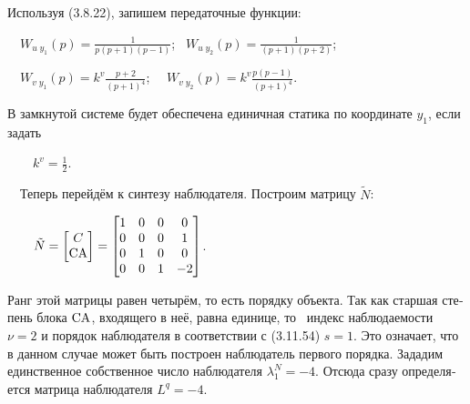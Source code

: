 \documentclass[a4paper]{article}
\newcommand\normalsubformula[1]{\text{\mathversion{normal}$#1$}}
\begin{document}
{\begin{russian}\sffamily
Используя (3.8.22), запишем передаточные функции:
\end{russian}}

{\begin{russian}\sffamily
\ \  $W_{u\;y_1}(p)=\frac 1{p(p+1)(p-1)}$; \  $W_{u\;y_2}(p)=\frac 1{(p+1)(p+2)}$;
\end{russian}}

{\begin{russian}\sffamily
\ \  $W_{v\;y_1}(p)=k^v\frac{p+2}{(p+1)^4}$; \ \  $W_{v\;y_2}(p)=k^v\frac{p(p-1)}{(p+1)^4}$.
\end{russian}}

{\begin{russian}\sffamily
В замкнутой системе будет обеспечена единичная статика по координате  $y_1$, если задать
\end{russian}}

{\begin{russian}\sffamily
\ \ \ \  $k^v=\frac 1 2$.
\end{russian}}


\bigskip


\bigskip


\bigskip

{\begin{russian}\sffamily
\ \ Теперь перейдём к синтезу наблюдателя. Построим матрицу  $\tilde  N$:
\end{russian}}

{\begin{russian}\sffamily
\ \ \ \  $\tilde 
N=\left[\begin{matrix}C\\\normalsubformula{\text{CA}}\end{matrix}\right]=\left[\begin{matrix}1&0&0&0\\0&0&0&1\\0&1&0&0\\0&0&1&-2\end{matrix}\right]$.
\end{russian}}

{\begin{russian}\sffamily
Ранг этой матрицы равен четырём, то есть порядку объекта. Так как старшая степень блока  $\normalsubformula{\text{CA}}$,
входящего в неё, равна единице, то \ индекс наблюдаемости  $ν=2$ и порядок наблюдателя в соответствии с (3.11.54) 
$s=1$. Это означает, что в данном случае может быть построен наблюдатель первого порядка. Зададим единственное
собственное число наблюдателя  $λ_1^N=-4$. Отсюда сразу определяется матрица наблюдателя  $L^q=-4$.
\end{russian}}
\end{document}
